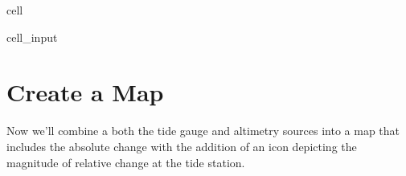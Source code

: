 \documentclass[letterpaper,10pt,english]{jupyterBook}
\begin{document}
\begin{sphinxuseclass}{cell}\begin{sphinxVerbatimInput}

\begin{sphinxuseclass}{cell_input}
\begin{sphinxVerbatim}[commandchars=\\\{\}]
    

  
  
\end{sphinxVerbatim}

\end{sphinxuseclass}\end{sphinxVerbatimInput}

\end{sphinxuseclass}

\chapter{Create a Map}
\label{\detokenize{notebooks/regional_and_local/SL_Trend:create-a-map}}\label{\detokenize{notebooks/regional_and_local/SL_Trend:id4}}
\sphinxAtStartPar
Now we’ll combine a both the tide gauge and altimetry sources into a map that includes the absolute change with the addition of an icon depicting the magnitude of relative change at the tide station.
\end{document}

